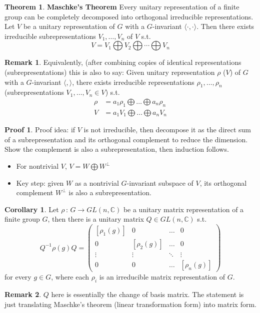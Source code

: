 \documentclass{book}
\newcommand{\C}{\mathbb{C}}
\newcommand{\inner}[1]{\langle #1 \rangle}
\theoremstyle{definition}
\newtheorem{theorem}[lemma]{Theorem}
\newtheorem{corollary}[lemma]{Corollary}
\theoremstyle{remarkstyle}
\newtheorem*{remark}{Remark}%
\newtheorem*{myproof}{Proof}%
\begin{document}
\begin{theorem}
    \textbf{Maschke's Theorem} \newline
    Every unitary representation of a finite group can be completely decomposed into orthogonal irreducible representations. \newline 
    Let $V$ be a unitary representation of $G$ with a $G$-invariant $\inner{\cdot,\cdot}$. Then there exists irreducible subrepresentations $V_1, \dots, V_n$ of $V$ s.t.
    $$
    V = V_1 \bigoplus V_2 \bigoplus \cdots \bigoplus V_n
    $$
\end{theorem}
\begin{remark}
    Equivalently, (after combining copies of identical representations (subrepresentations) this is also to say: \newline
    Given unitary representation $\rho$ ($V$) of $G$ with a $G$-invariant $\inner{,}$, there exists irreducible representations $\rho_1,\dots,\rho_n$ (subrepresentations $V_1,\dots,V_n \in V$) s.t. 
    \begin{align*}
        \rho &= a_1\rho_1 \bigoplus \dots \bigoplus a_n\rho_n \\
        V &= a_1V_1 \bigoplus \dots \bigoplus a_nV_n
    \end{align*}
\end{remark}
\begin{myproof}
    Proof idea: if $V$ is not irreducible, then decompose it as the direct sum of a subrepresentation and its orthogonal complement to reduce the dimension. Show the complement is also a subrepresentation, then induction follows. 
    \begin{itemize}
        \item For nontrivial $V$, $V=W\bigoplus W^\perp$ 
        \item Key step: given $W$ as a nontrivial $G$-invariant subspace of $V$, its orthogonal complement $W^\perp$ is also a subrepresentation.
    \end{itemize}
\end{myproof}

\begin{corollary}
    Let $\rho\,:\, G\rightarrow GL(n,\C)$ be a unitary matrix representation of a finite group $G$, then there is a unitary matrix $Q\in GL(n,\C) $ s.t. 
    $$
    Q^{-1}\rho(g)Q=\left(
    \begin{array}{cccc}
        [\rho_1(g)] & 0 & \dots & 0 \\
        0 & [\rho_2(g)] & \dots & 0 \\
        \vdots & \vdots & \ddots & \vdots \\
        0 & 0 & \dots & [\rho_n(g)]
    \end{array}
    \right)
    $$
    for every $g\in G$, where each $\rho_i$ is an irreducible matrix representation of $G$.
\end{corollary}
\begin{remark}
    $Q$ here is essentially the change of basis matrix. The statement is just translating Maschke's theorem (linear transformation form) into matrix form. \newline
\end{remark}
\end{document}
